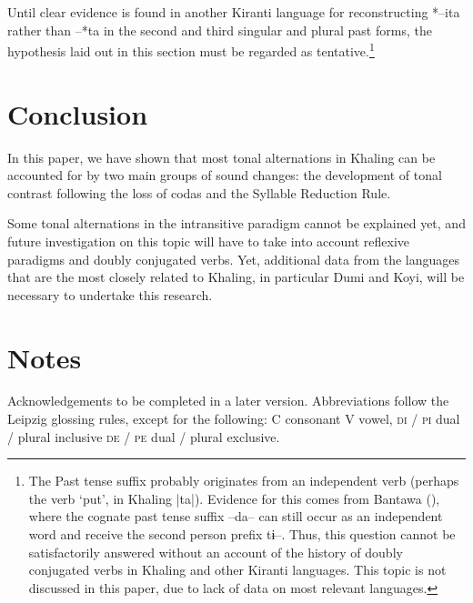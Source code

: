 \documentclass[oldfontcommands,oneside,a4paper,11pt]{article}
\newcommand{\ipa}[1]{{\phon \mbox{#1}}} %
\begin{document}
Until clear evidence is found in another Kiranti language for reconstructing \ipa{*--ita} rather than \ipa{--*ta} in the second and third singular and plural past forms, the hypothesis laid out in this section must be regarded as tentative.\footnote{The Past tense suffix probably originates from an independent verb (perhaps the verb `put', in Khaling |\ipa{ta}|). Evidence for this comes from Bantawa (\citealt[165-72]{doornenbal09}), where the cognate past tense suffix \ipa{--da--} can still occur as an independent word and receive the second person prefix \ipa{tɨ--}. Thus, this question cannot be satisfactorily answered without an account of the history of doubly conjugated verbs in Khaling and other Kiranti languages. This topic is not discussed in this paper, due to lack of data on most relevant languages.
}

\section{Conclusion}

In this paper, we have shown that most tonal alternations in Khaling can be accounted for by two main groups of sound changes: the development of tonal contrast following the loss of codas  and the Syllable Reduction Rule.

Some tonal alternations in the intransitive paradigm cannot be explained yet, and future investigation on this topic will have to take into account reflexive paradigms and doubly conjugated verbs. Yet, additional data from the languages that are the most closely related to Khaling, in particular Dumi and Koyi, will be necessary to undertake this research.

{\small
\section*{Notes}

Acknowledgements to be completed in a later version.
 Abbreviations follow the Leipzig glossing rules, except for the following: C consonant V vowel, \textsc{di} / \textsc{pi} dual / plural inclusive \textsc{de} / \textsc{pe} dual / plural exclusive.}



\end{document}
